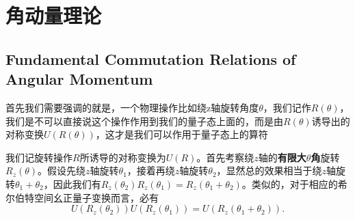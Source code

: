 \section{角动量理论}
\subsection{Fundamental Commutation Relations of Angular Momentum}
首先我们需要强调的就是，一个物理操作比如绕z轴旋转角度$\theta $，我们记作$R\left( \theta  \right)$，我们是不可以直接说这个操作作用到我们的量子态上面的，而是由$R\left( \theta  \right)$诱导出的对称变换$U\left( {R\left( \theta  \right)} \right)$，这才是我们可以作用于量子态上的算符\par
我们记旋转操作$R$所诱导的对称变换为$U(R)$。首先考察绕$z$轴的\textbf{有限大$\theta$角}旋转$R_z(\theta)$。假设先绕$z$轴旋转$\theta_1$，接着再绕$z$轴旋转$\theta_2$，显然总的效果相当于绕$z$轴旋转$\theta_1+\theta_2$，因此我们有$R_z(\theta_2)R_z(\theta_1)=R_z(\theta_1+\theta_2)$。类似的，对于相应的希尔伯特空间幺正量子变换而言，必有
\begin{equation}
	U(R_z(\theta_2))U(R_z(\theta_1))=U(R_z(\theta_1+\theta_2)). 
\end{equation}

